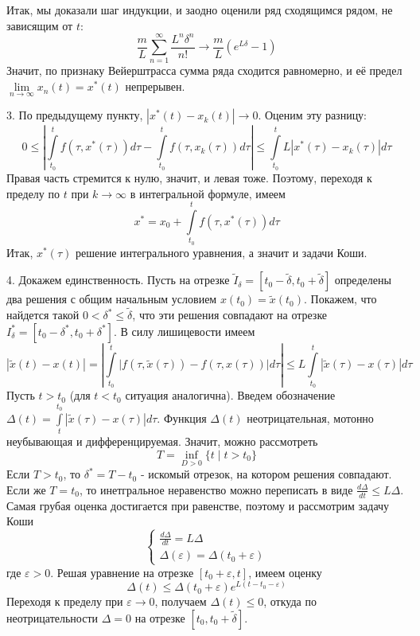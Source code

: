 Итак, мы доказали шаг индукции, и заодно оценили ряд сходящимся рядом, не 
зависящим от $t:$
$$\frac{m}{L}\sum\limits_{n=1}^{\infty}\frac{L^n\delta^n}{n!}\to
\frac{m}{L}\left( e^{L\delta}-1 \right)$$
Значит, по признаку Вейерштрасса сумма ряда сходится равномерно, и её 
предел $\lim\limits_{n \to \infty}x_n(t)=x^*(t)$ непрерывен. 

3. По предыдущему пункту, $|x^*(t)-x_k(t)|\to 0$. Оценим эту разницу:
$$0\leqslant 
\left| \int\limits_{t_0}^{t} f(\tau,x^*(\tau))d\tau-\int\limits_{t_0}^{t}
f(\tau,x_k(\tau))d\tau\right|\leqslant 
\int\limits_{t_0}^{t}L|x^*(\tau)-x_k(\tau)|d\tau$$
Правая часть стремится к нулю, значит, и левая тоже. Поэтому, переходя к
пределу  по $t$ при  $k\to \infty$ в интегральной формуле, имеем
$$x^*=x_0+\int\limits_{t_0}^{t}f(\tau,x^*(\tau))d\tau$$
Итак, $x^*(\tau)$ решение интегрального уравнения, а значит и задачи Коши. 

4. Докажем единственность. Пусть на отрезке $\tilde I_\delta=
[t_0-\tilde\delta,t_0+\tilde\delta]$ определены
два решения с общим начальным условием $x(t_0)=\tilde x(t_0)$.
Покажем, что найдется такой $0<\delta^*\leqslant \tilde\delta$,
что эти решения 
совпадают на отрезке $I^*_\delta = [t_0-\delta^*,t_0+\delta^*]$.
В силу лишицевости имеем
$$|\tilde x(t) - x(t)| = \left|\int\limits_{t_0}^{t}\big|f(\tau,\tilde 
x(\tau))-f(\tau,x(\tau))\big| d\tau \right| \leqslant 
L\int\limits_{t_0}^{t}|\tilde x(\tau) - x(\tau)|d\tau$$
Пусть $t>t_0$ (для $t<t_0$ ситуация аналогична). Введем обозначение
$\Delta(t) = \int\limits_{t}^{t_0} |\tilde x(\tau) - x(\tau)|d\tau$.  
Функция $\Delta(t)$ неотрицательная, мотонно неубывающая и дифференцируемая.
Значит, можно рассмотреть
 $$T=\inf\limits_{D>0}\{t\mid t>t_0\}$$ 
Если $T>t_0$, то $\delta^* = T - t_0$ - искомый отрезок, на котором решения
совпадают. Если же $T=t_0$, то инетгральное неравенство можно переписать
в виде $\frac{d\Delta}{dt}\leqslant L\Delta$. Самая грубая оценка достигается
при равенстве, поэтому и рассмотрим задачу Коши
$$\begin{cases}
    \frac{d\Delta}{dt} = L\Delta \\
    \Delta(\varepsilon) = \Delta(t_0+\varepsilon)
\end{cases}$$
где $\varepsilon>0$. Решая уравнение на отрезке $[t_0+\varepsilon,t]$,
имеем оценку
$$\Delta(t)\leqslant \Delta(t_0+\varepsilon)e^{L(t-t_0-\varepsilon)}$$
Переходя к пределу при $\varepsilon\to 0$, получаем 
$\Delta(t)\leqslant 0$, откуда по неотрицательности $\Delta=0$
на отрезке  $[t_0,t_0+\tilde\delta]$. 



